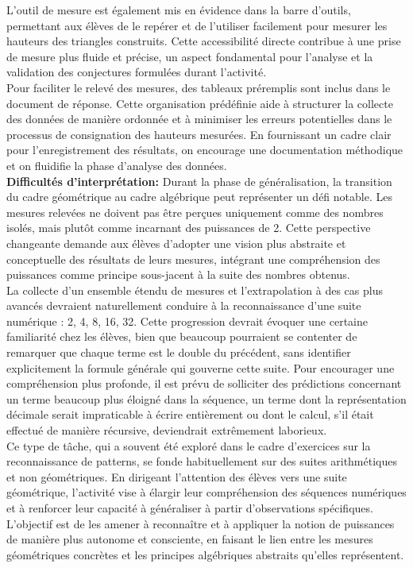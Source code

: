 L'outil de mesure est également mis en évidence dans la barre d'outils,
permettant aux élèves de le repérer et de l'utiliser facilement pour mesurer les hauteurs des triangles construits.
Cette accessibilité directe contribue à une prise de mesure plus fluide et précise,
un aspect fondamental pour l'analyse et la validation des conjectures formulées durant l'activité.\\

Pour faciliter le relevé des mesures,
des tableaux préremplis sont inclus dans le document de réponse.
Cette organisation prédéfinie aide à structurer la collecte des données de manière ordonnée et à minimiser les erreurs potentielles dans le processus de consignation des hauteurs mesurées.
En fournissant un cadre clair pour l'enregistrement des résultats,
on encourage une documentation méthodique et on fluidifie la phase d'analyse des données.\\

\textbf{Difficultés d'interprétation:}
Durant la phase de généralisation,
la transition du cadre géométrique au cadre algébrique peut représenter un défi notable.
Les mesures relevées ne doivent pas être perçues uniquement comme des nombres isolés,
mais plutôt comme incarnant des puissances de 2.
Cette perspective changeante demande aux élèves d'adopter une vision plus abstraite et conceptuelle des résultats de leurs mesures,
intégrant une compréhension des puissances comme principe sous-jacent à la suite des nombres obtenus.\\

La collecte d'un ensemble étendu de mesures et l'extrapolation à des cas plus avancés devraient naturellement conduire à la reconnaissance d'une suite numérique :
2, 4, 8, 16, 32.
Cette progression devrait évoquer une certaine familiarité chez les élèves,
bien que beaucoup pourraient se contenter de remarquer que chaque terme est le double du précédent,
sans identifier explicitement la formule générale qui gouverne cette suite.
Pour encourager une compréhension plus profonde,
il est prévu de solliciter des prédictions concernant un terme beaucoup plus éloigné dans la séquence,
un terme dont la représentation décimale serait impraticable à écrire entièrement ou dont le calcul,
s'il était effectué de manière récursive,
deviendrait extrêmement laborieux.\\

Ce type de tâche,
qui a souvent été exploré dans le cadre d'exercices sur la reconnaissance de patterns,
se fonde habituellement sur des suites arithmétiques et non géométriques.
En dirigeant l'attention des élèves vers une suite géométrique,
l'activité vise à élargir leur compréhension des séquences numériques et à renforcer leur capacité à généraliser à partir d'observations spécifiques.
L'objectif est de les amener à reconnaître et à appliquer la notion de puissances de manière plus autonome et consciente,
en faisant le lien entre les mesures géométriques concrètes et les principes algébriques abstraits qu'elles représentent.\\

